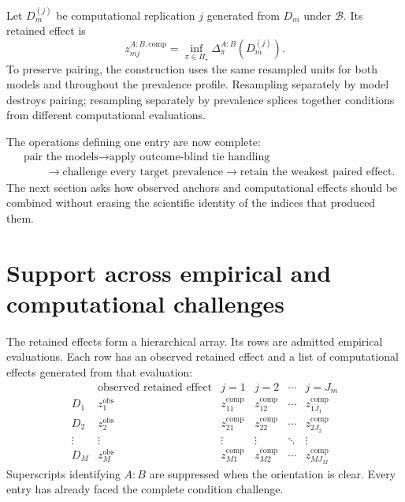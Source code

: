 \documentclass[11pt]{article}
\newcommand{\PSet}{\Pi_\star}
\newcommand{\Boot}{\mathcal{B}}
\theoremstyle{remark}
\begin{document}
Let $D_m^{(j)}$ be computational replication $j$ generated from $D_m$ under
$\Boot$. Its retained effect is
\begin{equation}
z_{mj}^{A:B,\mathrm{comp}}
=
\inf_{\pi\in\PSet}\Delta^{A:B}_\pi(D_m^{(j)}).
\label{eq:computational-retained}
\end{equation}
To preserve pairing, the construction uses the same resampled units for both
models and throughout the prevalence profile. Resampling separately by model
destroys pairing; resampling separately by prevalence splices together
conditions from different computational evaluations.

The operations defining one entry are now complete:
\[
\begin{aligned}
&\text{pair the models}
\longrightarrow
\text{apply outcome-blind tie handling}\\
&\qquad\longrightarrow
\text{challenge every target prevalence}
\longrightarrow
\text{retain the weakest paired effect}.
\end{aligned}
\]
The next section asks how observed anchors and computational effects should be
combined without erasing the scientific identity of the indices that produced
them.


\section{Support across empirical and computational challenges}
\label{sec:hierarchy}

The retained effects form a hierarchical array. Its rows are admitted
empirical evaluations. Each row has an observed retained effect and a list of
computational effects generated from that evaluation:
\begin{equation}
\begin{array}{c|c|cccc}
&\text{observed retained effect}&j=1&j=2&\cdots&j=J_m\\
\hline
D_1&z_1^{\mathrm{obs}}&z_{11}^{\mathrm{comp}}&z_{12}^{\mathrm{comp}}&\cdots&z_{1J_1}^{\mathrm{comp}}\\
D_2&z_2^{\mathrm{obs}}&z_{21}^{\mathrm{comp}}&z_{22}^{\mathrm{comp}}&\cdots&z_{2J_2}^{\mathrm{comp}}\\
\vdots&\vdots&\vdots&\vdots&\ddots&\vdots\\
D_M&z_M^{\mathrm{obs}}&z_{M1}^{\mathrm{comp}}&z_{M2}^{\mathrm{comp}}&\cdots&z_{MJ_M}^{\mathrm{comp}}
\end{array}
\label{eq:effect-array}
\end{equation}
Superscripts identifying $A:B$ are suppressed when the orientation is clear.
Every entry has already faced the complete condition challenge.
\end{document}
